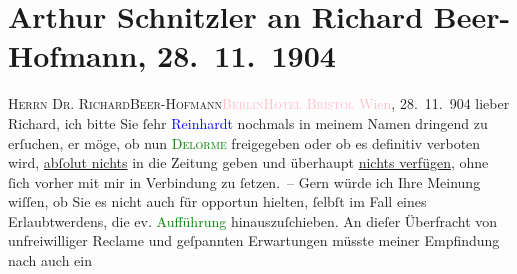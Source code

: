 

               \section[Arthur Schnitzler an Richard Beer-Hofmann, 28. 11. 1904]{ Arthur Schnitzler an Richard Beer-Hofmann, 28. 11. 1904}\nopagebreak{}\rehead{ }\normalsize\beginnumbering{} \toendnotes[C]{\smallbreak\pagebreak[2]} 
\toendnotes[C]{\smallbreak}\pstart{}{\pb}\textsc{Herrn Dr. Richard}\pend{}\pstart{}\textsc{Beer-Hofmann}\pend{}\pstart{}\textsc{\textcolor{pink}{Berlin}{}\ledrightnote{\textcolor{pink}{Berlin}}}\pend{}\pstart{}\textsc{\textcolor{pink}{Hotel Bristol}{}\ledrightnote{\textcolor{pink}{Hotel Bristol}}}\pend{}{\bigskip}\pstart
           \raggedleft{}{\pb}\textcolor{pink}{Wien}{}\ledrightnote{\textcolor{pink}{Wien}}, 28. 11. 904\pend
           \pstart{}lieber Richard,\pend\pstart
           ich bitte Sie ſehr \textcolor{blue}{Reinhardt}{}\ledrightnote{\textcolor{blue}{Max Reinhardt}} nochmals in meinem
               Namen dringend zu erſuchen, er möge, ob nun \textcolor{green}{\textsc{Delorme}}{}\ledrightnote{\textcolor{green}{Das Haus Delorme. Eine Familienszene}} freigegeben oder ob es definitiv verboten wird, \uline{abſolut nichts} in die Zeitung geben und überhaupt \uline{nichts verfügen}, ohne ſich vorher mit mir in Verbin{\pb}dung zu ſetzen. –\pend
           \pstart
           Gern würde ich Ihre Meinung wiſſen, ob Sie es nicht auch für opportun hielten, ſelbſt
               im Fall eines Erlaubtwerdens, die \strikeout{\textcolor{gray}{Geſchichte}} ev. \textcolor{green}{Aufführung}{}
               hinauszuſchieben. An dieſer Überfracht von unfreiwilliger Reclame und geſpannten
               Erwartungen müsste meiner {\pb}Empfindung nach auch ein
